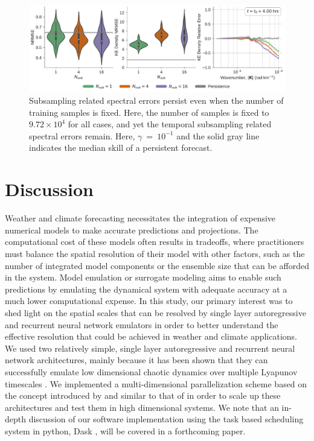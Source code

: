 \documentclass[draft]{agujournal2019}
\newcommand{\citep}{\cite}
\newcommand{\citet}{\citeA}
\begin{document}
\begin{figure}
    \centering
    \includegraphics[width=\textwidth]{rc_fixed_steps.pdf}
    \caption{Subsampling related spectral errors persist even when the number of
        training samples is fixed. Here, the number of samples is fixed to
        $9.72\times10^{4}$ for all cases, and yet the temporal subsampling
        related spectral errors remain.
        Here, $\gamma$~=~$10^{-1}$ and the solid gray line indicates the median skill of a persistent
        forecast.
    }
    \label{fig:esn-fixed-steps}
\end{figure}

\section{Discussion}
\label{sec:discussion}

Weather and climate forecasting necessitates the integration of expensive
numerical models to make accurate predictions and projections.
The computational cost of these models often results in tradeoffs, where
practitioners must balance the spatial resolution of their model with other
factors, such as the number of integrated model components or the ensemble
size that can be afforded in the system.
Model emulation or surrogate modeling aims to enable such predictions
by emulating the dynamical system with adequate accuracy at a much lower
computational expense.
In this study, our primary interest was to shed light on the spatial scales
that can be resolved by single layer autoregressive and recurrent
neural network emulators in order to better
understand the effective resolution that could be achieved in weather and
climate applications.
We used two relatively simple, single layer autoregressive and recurrent neural
network architectures, mainly because it has been shown that they can
successfully emulate low dimensional chaotic dynamics over multiple Lyapunov
timescales
\citep{pathak_using_2017,vlachas_backpropagation_2020,gauthier_next_2021,platt_systematic_2022}.
We implemented a multi-dimensional parallelization scheme based on the concept
introduced by \citet{pathak_model-free_2018} and similar to that of
\citet{arcomano_machine_2020}
in order to scale up these architectures and test them in high dimensional
systems.
We note that an in-depth discussion of our software implementation using the
task based scheduling system in python, Dask \citep{dask_2016}, will be covered in a
forthcoming paper.
\end{document}
